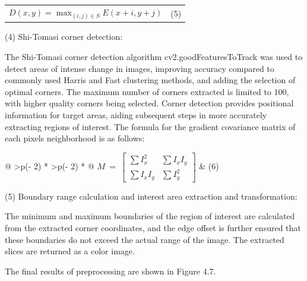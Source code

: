 \documentclass[
]{article}
\newcounter{none} %
\begin{document}
{\def\LTcaptype{none} %
\begin{longtable}[]{@{}
  >{\raggedright\arraybackslash}p{}
  >{\centering\arraybackslash}p{}@{}}
\toprule\noalign{}
\endhead
\bottomrule\noalign{}
\endlastfoot
\(D(x,y) = \max_{(i,j) \in S}E(x + i,y + j)\) & (5) \\
\end{longtable}
}

(4) Shi-Tomasi corner detection:

The Shi-Tomasi corner detection algorithm cv2.goodFeaturesToTrack was
used to detect areas of intense change in images, improving accuracy
compared to commonly used Harris and Fast clustering methods, and adding
the selection of optimal corners. The maximum number of corners
extracted is limited to 100, with higher quality corners being selected.
Corner detection provides positional information for target areas,
aiding subsequent steps in more accurately extracting regions of
interest. The formula for the gradient covariance matrix of each
pixel\textquotesingle s neighborhood is as follows:

{\def\LTcaptype{none} %
\begin{longtable}[]{@{}
  >{\centering\arraybackslash}p{}
  >{\centering\arraybackslash}p{}@{}}
\toprule\noalign{}
\endhead
\bottomrule\noalign{}
\endlastfoot
\(M\  = \ \begin{bmatrix}
\sum I_{x}^{2} & \sum I_{x}I_{y} \\
\sum I_{x}I_{y} & \sum I_{y}^{2}
\end{bmatrix}\) & (6) \\
\end{longtable}
}

(5) Boundary range calculation and interest area extraction and
transformation:

The minimum and maximum boundaries of the region of interest are
calculated from the extracted corner coordinates, and the edge offset is
further ensured that these boundaries do not exceed the actual range of
the image. The extracted slices are returned as a color image.

The final results of preprocessing are shown in Figure 4.7.
\end{document}
